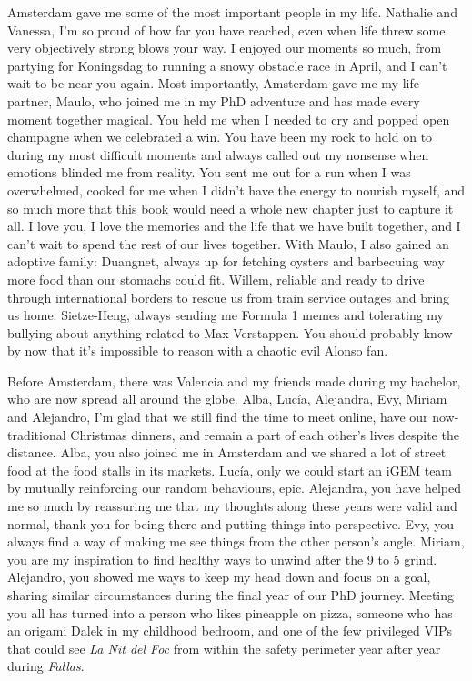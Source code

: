 Amsterdam gave me some of the most important people in my life. Nathalie and Vanessa, I'm so proud of how far you have reached, even when life threw some very objectively strong blows your way. I enjoyed our moments so much, from partying for Koningsdag to running a snowy obstacle race in April, and I can't wait to be near you again. Most importantly, Amsterdam gave me my life partner, Maulo, who joined me in my PhD adventure and has made every moment together magical. You held me when I needed to cry and popped open champagne when we celebrated a win. You have been my rock to hold on to during my most difficult moments and always called out my nonsense when emotions blinded me from reality. You sent me out for a run when I was overwhelmed, cooked for me when I didn't have the energy to nourish myself, and so much more that this book would need a whole new chapter just to capture it all. I love you, I love the memories and the life that we have built together, and I can't wait to spend the rest of our lives together. With Maulo, I also gained an adoptive family: Duangnet, always up for fetching oysters and barbecuing way more food than our stomachs could fit. Willem, reliable and ready to drive through international borders to rescue us from train service outages and bring us home. Sietze-Heng, always sending me Formula 1 memes and tolerating my bullying about anything related to Max Verstappen. You should probably know by now that it's impossible to reason with a chaotic evil Alonso fan.

Before Amsterdam, there was Valencia and my friends made during my bachelor, who are now spread all around the globe. Alba, Lucía, Alejandra, Evy, Miriam and Alejandro, I'm glad that we still find the time to meet online, have our now-traditional Christmas dinners, and remain a part of each other's lives despite the distance. Alba, you also joined me in Amsterdam and we shared a lot of street food at the food stalls in its markets. Lucía, only we could start an iGEM team by mutually reinforcing our random behaviours, epic. Alejandra, you have helped me so much by reassuring me that my thoughts along these years were valid and normal, thank you for being there and putting things into perspective. Evy, you always find a way of making me see things from the other person’s angle. Miriam, you are my inspiration to find healthy ways to unwind after the 9 to 5 grind. Alejandro, you showed me ways to keep my head down and focus on a goal, sharing similar circumstances during the final year of our PhD journey. Meeting you all has turned into a person who likes pineapple on pizza, someone who has an origami Dalek in my childhood bedroom, and one of the few privileged VIPs that could see \textit{La Nit del Foc} from within the safety perimeter year after year during \textit{Fallas}.

